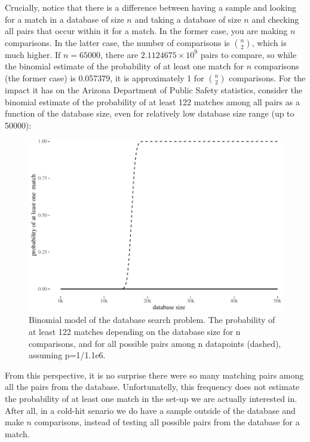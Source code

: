 \documentclass[10pt,dvipsnames,enabledeprecatedfontcommands]{scrartcl}
\begin{document}
Crucially, notice that there is a difference between having a sample and
looking for a match in a database of size \(n\) and taking a database of
size \(n\) and checking all pairs that occur within it for a match. In
the former case, you are making \(n\) comparisons. In the latter case,
the number of comparisons is \({n \choose 2}\), which is much higher. If
\(n=65000\), there are \ensuremath{2.1124675\times 10^{9}} pairs to
compare, so while the binomial estimate of the probability of at least
one match for \(n\) comparisons (the former case) is 0.057379, it is
approximately 1 for \({n \choose 2}\) comparisons. For the impact it has
on the Arizona Department of Public Safety statistics, consider the
binomial estimate of the probability of at least 122 matches among all
pairs as a function of the database size, even for relatively low
database size range (up to 50000):

\begin{figure}

{\centering \includegraphics[width=1\linewidth]{lr-chapter2_files/figure-latex/unnamed-chunk-5-1} 

}

\caption{Binomial model of the database search problem. The probability of at least 122 matches depending on the database size for n comparisons, and for all possible pairs among n datapoints (dashed), assuming p=1/1.1e6.}\label{fig:unnamed-chunk-5}
\end{figure}

From this perspective, it is no surprise there were so many matching
pairs among all the pairs from the database. Unfortunatelly, this
frequency does not estimate the probability of at least one match in the
set-up we are actually interested in. After all, in a cold-hit senario
we do have a sample outside of the database and make \(n\) comparisons,
instead of testing all possible pairs from the database for a match.
\end{document}

